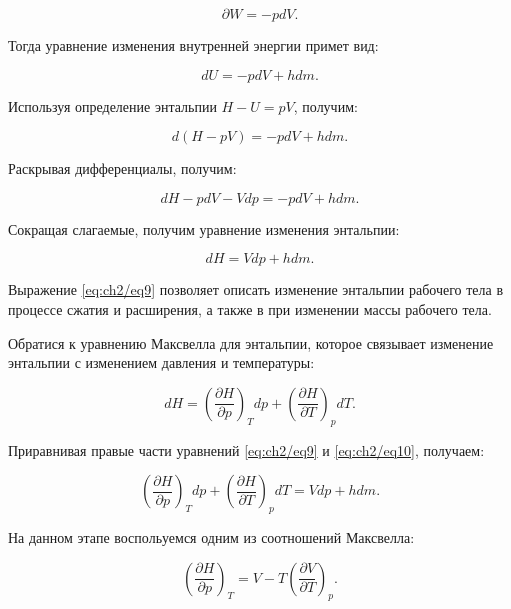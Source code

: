 \begin{equation*}
    \partial W = -pdV.
\end{equation*}

Тогда уравнение изменения внутренней энергии примет вид:

\begin{equation*}
    dU = -pdV + hdm.
\end{equation*}

Используя определение энтальпии $H - U = pV$, получим:

\begin{equation*}
    d(H-pV) = -pdV + hdm.
\end{equation*}

Раскрывая дифференциалы, получим:

\begin{equation*}
    dH - pdV - Vdp = -pdV + hdm.
\end{equation*}

Сокращая слагаемые, получим уравнение изменения энтальпии:

\begin{equation}\label{eq:ch2/eq9}
    dH = Vdp + hdm.
\end{equation}

Выражение \eqref{eq:ch2/eq9} позволяет описать изменение энтальпии рабочего тела в процессе сжатия и
расширения, а также в при изменении массы рабочего тела.

Обратися к уравнению Максвелла для энтальпии, которое связывает изменение энтальпии с изменением давления и температуры:

\begin{equation}\label{eq:ch2/eq10}
    dH = \left(
        \frac{\partial H}{\partial p}
    \right)_T dp + \left(
        \frac{\partial H}{\partial T}
    \right)_p dT.
\end{equation}

Приравнивая правые части уравнений \eqref{eq:ch2/eq9} и \eqref{eq:ch2/eq10}, получаем:

\begin{equation}\label{eq:ch2/eq11}
    \left(
        \frac{\partial H}{\partial p}
    \right)_T dp + \left(
        \frac{\partial H}{\partial T}
    \right)_p dT = Vdp + hdm.
\end{equation}

На данном этапе воспольуемся одним из соотношений Максвелла:

\begin{equation*}
    \left(
        \frac{\partial H}{\partial p}
    \right)_T = V - T \left(
        \frac{\partial V}{\partial T}
    \right)_p.
\end{equation*}

